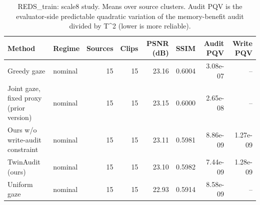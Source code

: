 \begin{table}[t]
\centering
\caption{REDS\_train: scale8 study. Means over source clusters. Audit PQV is the evaluator-side predictable quadratic variation of the memory-benefit audit divided by T^2 (lower is more reliable).}
\label{tab:scale8_REDS_train}
\small
\begin{tabular}{llrrrrrr}
\toprule
Method & Regime & Sources & Clips & PSNR (dB) & SSIM & Audit PQV & Write PQV \\
\midrule
Greedy gaze & nominal & 15 & 15 & 23.16 & 0.6004 & 3.08e-07 & -- \\
Joint gaze, fixed proxy (prior version) & nominal & 15 & 15 & 23.15 & 0.6000 & 2.65e-08 & -- \\
Ours w/o write-audit constraint & nominal & 15 & 15 & 23.11 & 0.5981 & 8.86e-09 & 1.27e-09 \\
TwinAudit (ours) & nominal & 15 & 15 & 23.10 & 0.5982 & 7.44e-09 & 1.28e-09 \\
Uniform gaze & nominal & 15 & 15 & 22.93 & 0.5914 & 8.58e-09 & -- \\
\bottomrule
\end{tabular}
\end{table}
